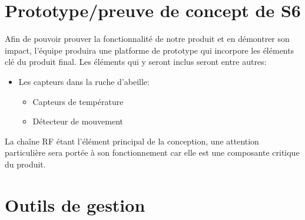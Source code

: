 \documentclass[12pt,titlepage=true,letterpaper,pointlessnumbers,headings=normal,captions=nooneline]{scrartcl}
\begin{document}
\section{Prototype/preuve de concept de S6}
Afin de pouvoir prouver la fonctionnalité de notre produit et en démontrer son impact, l'équipe produira une platforme de prototype qui incorpore les éléments clé du produit final. Les éléments qui y seront inclus seront entre autres:
\begin{itemize}
	\item Les capteurs dans la ruche d'abeille:
	\begin{itemize}
		\item Capteurs de température
		\item Détecteur de mouvement
	\end{itemize}
\end{itemize}
\medskip
La chaîne RF étant l'élément principal de la conception, une attention particulière sera portée à son fonctionnement car elle est une composante critique du produit.

\section{Outils de gestion}
\end{document}
